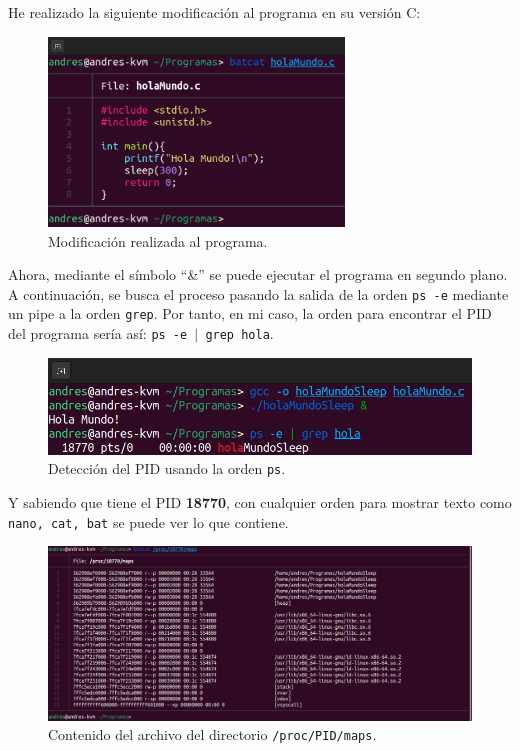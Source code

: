 \documentclass{article}
\begin{document}
\bigskip

He realizado la siguiente modificación al programa en su versión C:

\begin{figure}[H]
    \centering
    \includegraphics[width=0.7\textwidth]{imagenes/Captura desde 2022-11-17 18-12-25.png}
    \caption{Modificación realizada al programa.}
\end{figure}

\newpage

Ahora, mediante el símbolo ``\&'' se puede ejecutar el programa en segundo plano. A continuación, se busca el proceso pasando la salida de la orden \verb|ps -e| mediante un pipe a la orden \verb|grep|. Por tanto, en mi caso, la orden para encontrar el PID del programa sería así: \texttt{ps -e $\vert$ grep hola}.

\begin{figure}[H]
    \includegraphics[width=\textwidth]{imagenes/ps.png}
    \caption{Detección del PID usando la orden \texttt{ps}.}
\end{figure}


Y sabiendo que tiene el PID \textbf{18770}, con cualquier orden para mostrar texto como \texttt{nano, cat, bat} se puede ver lo que contiene.

\begin{figure}[H]
    \includegraphics[width=\textwidth]{imagenes/procPID.png}
    \caption{Contenido del archivo del directorio \texttt{/proc/PID/maps}.}
\end{figure}
\end{document}
